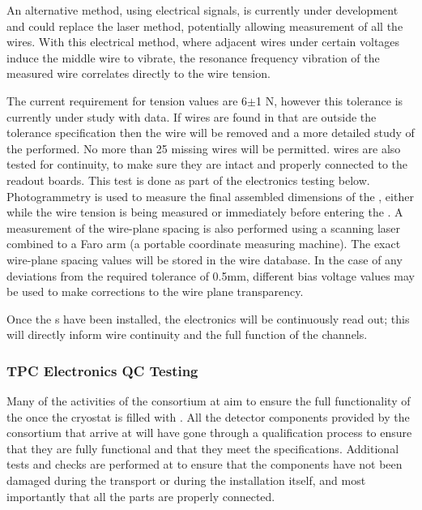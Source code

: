 An alternative method, using electrical signals, is currently under development and could replace the laser method, potentially allowing measurement of all the wires. 
With this electrical method, where adjacent wires under certain voltages induce the middle wire to vibrate, the resonance frequency vibration of the measured wire correlates directly
to the wire tension. 

The current requirement for tension values are 6$\pm$1 N, however this tolerance is currently under study with  data.  
If wires are found in  that are outside the tolerance specification then the wire will be removed and a more detailed study of the  performed. 
No more than 25 missing wires will be permitted. 
 wires are also tested for continuity, to make sure they are intact and properly connected to the readout boards.
This test is done as part of the  electronics testing below. 
Photogrammetry is used to measure the final assembled dimensions of the , either while the wire tension is being measured or immediately before entering the \coldbox. A measurement of the wire-plane spacing is also performed using a scanning laser combined to a Faro arm (a portable coordinate measuring machine). The exact wire-plane spacing values will be stored in the wire  database.  In the case of %
any deviations from the required tolerance of 0.5mm, different bias voltage values may be used to make corrections to the wire plane transparency. 

Once the s have been installed, the  electronics will be continuously read out;  this will directly inform wire continuity and the full function of the channels. 

\subsubsection{TPC Electronics QC Testing}

Many of the activities of the  consortium at  aim to ensure the full functionality of the  once the cryostat is filled with . 
All the detector components provided by the  consortium that arrive at  will have gone through a qualification process to ensure that they are fully functional and that they meet the  specifications. 
Additional tests and checks are performed at 
to ensure that the components have not
been damaged during the transport or during the installation itself,
and most importantly that all the parts are properly connected.

